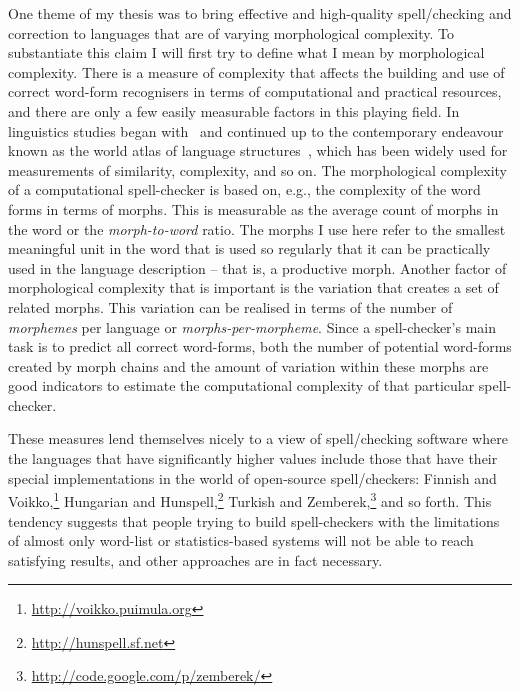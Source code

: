 \documentclass[officiallayout,final]{unihelcompling}
\begin{document}
One theme of my thesis was to bring effective and high-quality spell\-/checking
and correction to languages that are of varying \gls{morphological complexity}.
To substantiate this claim I will first try to define what I mean by
morphological complexity. There is a measure of complexity that affects the
building and use of correct word-form recognisers in terms of computational and
practical resources, and there are only a few easily measurable factors in this
playing field. In linguistics studies began
with~\citet{greenberg1960quantitative} and continued up to the contemporary
endeavour known as the world atlas of language structures~\citep{wals}, which
has been widely used for measurements of similarity, complexity, and so on.
The morphological complexity of a computational spell-checker is based on,
e.g., the complexity of the word forms in terms of \glspl{morph}.  This is
measurable as the average count of morphs in the word or the
\emph{morph-to-word} ratio. The morphs I use here refer to the smallest
meaningful unit in the word that is used so regularly that it can be
practically used in the language description -- that is, a productive morph.
Another factor of morphological complexity that is important is the variation
that creates a set of related morphs. This variation can be realised in terms
of the number of \emph{morphemes} per language or \emph{morphs-per-morpheme}.
Since a spell-checker's main task is to predict all correct word-forms, both
the number of potential word-forms created by morph chains and the amount of
variation within these morphs are good indicators to estimate the computational
complexity of that particular spell-checker.

These measures lend themselves nicely to a view of spell\-/checking
software where the languages that have significantly higher values 
include those that have their special implementations in the
world of open-source spell\-/checkers: Finnish and
Voikko,\footnote{\url{http://voikko.puimula.org}} Hungarian and
Hunspell,\footnote{\url{http://hunspell.sf.net}} Turkish and
Zemberek,\footnote{\url{http://code.google.com/p/zemberek/}} and so forth.
This tendency suggests that people trying to build spell-checkers with the
limitations of almost only word-list or statistics-based systems will not be
able to reach satisfying results, and other approaches are in fact necessary.
\end{document}
